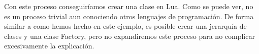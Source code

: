 Con este proceso conseguiríamos crear una clase en Lua. Como se puede ver, no es un proceso trivial aun conociendo otros lenguajes de programación. De forma similar a como hemos hecho en este ejemplo, es posible crear una jerarquía de clases y una clase Factory, pero no expandiremos este proceso para no complicar excesivamente la explicación.

